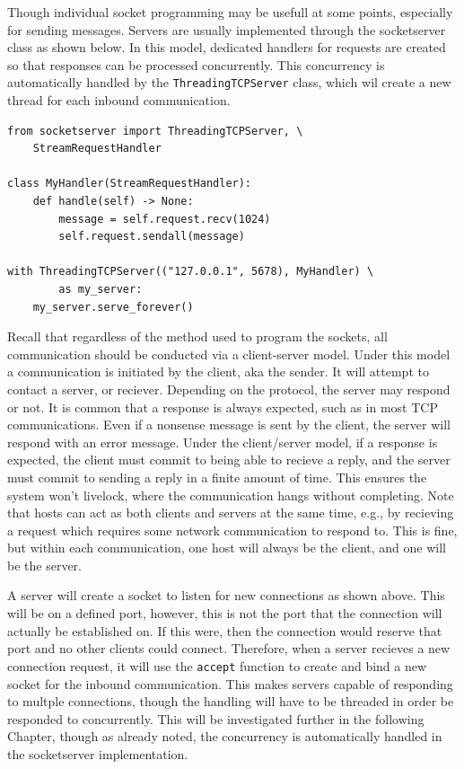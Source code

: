 Though individual socket programming may be usefull at some points, especially for sending messages. Servers are usually implemented through the socketserver class as shown below. In this model, dedicated handlers for requests are created so that responses can be processed concurrently. This concurrency is automatically handled by the \texttt{ThreadingTCPServer} class, which wil create a new thread for each inbound communication.

\begin{lstlisting}
from socketserver import ThreadingTCPServer, \
	StreamRequestHandler

class MyHandler(StreamRequestHandler):
	def handle(self) -> None:
		message = self.request.recv(1024)
		self.request.sendall(message)

with ThreadingTCPServer(("127.0.0.1", 5678), MyHandler) \
		as my_server:
	my_server.serve_forever()
\end{lstlisting}

Recall that regardless of the method used to program the sockets, all communication should be conducted via a client-server model. Under this model a communication is initiated by the client, aka the sender. It will attempt to contact a server, or reciever. Depending on the protocol, the server may respond or not. It is common that a response is always expected, such as in most TCP communications. Even if a nonsense message is sent by the client, the server will respond with an error message. Under the client/server model, if a response is expected, the client must commit to being able to recieve a reply, and the server must commit to sending a reply in a finite amount of time. This ensures the system won't livelock, where the communication hangs without completing. Note that hosts can act as both clients and servers at the same time, e.g., by recieving a request which requires some network communication to respond to. This is fine, but within each communication, one host will always be the client, and one will be the server.

A server will create a socket to listen for new connections as shown above. This will be on a defined port, however, this is not the port that the connection will actually be established on. If this were, then the connection would reserve that port and no other clients could connect. Therefore, when a server recieves a new connection request, it will use the \texttt{accept} function to create and bind a new socket for the inbound communication. This makes servers capable of responding to multple connections, though the handling will have to be threaded in order be responded to concurrently. This will be investigated further in the following Chapter, though as already noted, the concurrency is automatically handled in the socketserver implementation.

